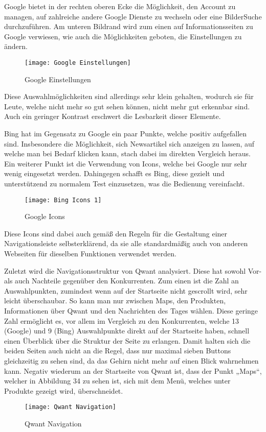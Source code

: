 Google bietet in der rechten oberen Ecke die Möglichkeit, den Account zu managen, auf zahlreiche andere Google Dienste zu
wechseln oder eine Bilder\-Suche durchzuführen. Am unteren Bildrand wird zum einen auf Informationsseiten zu Google verwiesen,
wie auch die Möglichkeiten geboten, die Einstellungen zu ändern.
\begin{figure}[h]
    \centering
    \texttt{[image: Google Einstellungen]}
    \caption{Google Einstellungen}
\end{figure}
Diese Auswahlmöglichkeiten sind allerdings sehr klein gehalten,
wodurch sie für Leute, welche nicht mehr so gut sehen können, nicht mehr gut erkennbar sind. Auch ein geringer Kontrast
erschwert die Lesbarkeit dieser Elemente.

Bing hat im Gegensatz zu Google ein paar Punkte, welche positiv aufgefallen sind. Insbesondere die Möglichkeit, sich Newsartikel
sich anzeigen zu lassen, auf welche man bei Bedarf klicken kann, stach dabei im direkten Vergleich heraus. Ein weiterer Punkt
ist die Verwendung von Icons, welche bei Google nur sehr wenig eingesetzt werden. Dahingegen schafft es Bing, diese gezielt
und unterstützend zu normalem Test einzusetzen, was die Bedienung vereinfacht.
\begin{figure}[h]
    \centering
    \texttt{[image: Bing Icons 1]}
    \caption{Google Icons}
\end{figure}
Diese Icons sind dabei auch gemäß den Regeln
für die Gestaltung einer Navigationsleiste\cite[Seite 17]{Maulhardt.20220621b} selbsterklärend, da sie alle standardmäßig auch von
anderen Webseiten für dieselben Funktionen verwendet werden.

Zuletzt wird die Navigationsstruktur von Qwant analysiert. Diese hat sowohl Vor- als auch Nachteile gegenüber den Konkurrenten.
Zum einen ist die Zahl an Auswahlpunkten, zumindest wenn auf der Startseite nicht gescrollt wird, sehr leicht überschaubar.
So kann man nur zwischen Maps, den Produkten, Informationen über Qwant und den Nachrichten des Tages wählen. Diese geringe
Zahl ermöglicht es, vor allem im Vergleich zu den Konkurrenten, welche 13 (Google) und 9 (Bing) Auswahlpunkte direkt auf der
Startseite haben, schnell einen Überblick über die Struktur der Seite zu erlangen. Damit halten sich die beiden Seiten auch
nicht an die Regel, dass nur maximal sieben Buttons gleichzeitig zu sehen sind, da das Gehirn nicht mehr auf einen Blick
wahrnehmen kann\cite[Seite 16]{Maulhardt.20220621b}. Negativ wiederum an der Startseite von Qwant ist, dass der Punkt „Maps“, welcher
in Abbildung {34} zu sehen ist, sich mit dem Menü, welches unter Produkte gezeigt wird, überschneidet.
\begin{figure}[h]
    \centering
    \texttt{[image: Qwant Navigation]}
    \caption{Qwant Navigation}
\end{figure}

